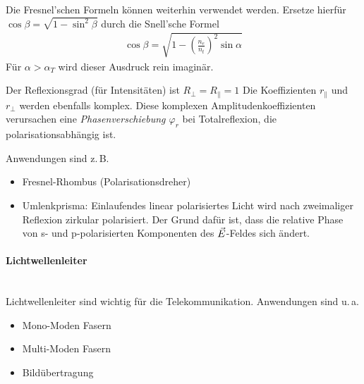 Die Fresnel'schen Formeln können weiterhin verwendet
werden. Ersetze hierfür $\cos\beta = \sqrt{1-\sin^2\beta}$ durch
die Snell'sche Formel
\begin{gather*}
  \cos\beta = \sqrt{
    1 - \left(\frac{n_e}{n_t}\right)^2 \sin\alpha
  }
\end{gather*}
Für $\alpha>\alpha_T$ wird dieser Ausdruck rein imaginär.

Der Reflexionsgrad (für Intensitäten) ist $R_\bot=R_\parallel=1$
Die Koeffizienten $r_\parallel$ und $r_\bot$ werden ebenfalls komplex.
Diese komplexen Amplitudenkoeffizienten verursachen eine
\emph{Phasenverschiebung $\varphi_r$}
bei Totalreflexion, die polarisationsabhängig ist.

Anwendungen sind z.\,B.
\begin{itemize}
\item Fresnel-Rhombus (Polarisationsdreher)
\item Umlenkprisma: Einlaufendes linear polarisiertes Licht wird
  nach zweimaliger Reflexion zirkular polarisiert.
  Der Grund dafür ist, dass die relative Phase von s- und
  p-polarisierten Komponenten des $\vec{E}$-Feldes sich ändert.
\end{itemize}

\paragraph{Lichtwellenleiter}
\sFolien\\
Lichtwellenleiter sind wichtig für die Telekommunikation. 
Anwendungen sind u.\,a.
\begin{itemize}
\item Mono-Moden Fasern
\item Multi-Moden Fasern
\item Bildübertragung
\end{itemize}


